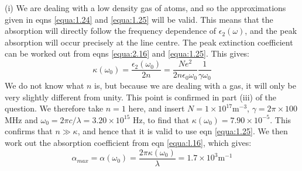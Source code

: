 \documentclass[12pt]{book}
\def\m{\mathrm{m}}
\begin{document}
\begin{Answer}
  (i) We are dealing with a low density gas of atoms, and so the approximations given in eqns \ref{equa:1.24} and \ref{equa:1.25} will be valid. This means that the absorption will directly follow the frequency dependence of $\epsilon_2(\omega)$, and the peak absorption will occur precisely at the line centre. The peak extinction coefficient can be worked out from eqns \ref{equa:2.16} and \ref{equa:1.25}. This gives:
  \begin{equation*}
    \kappa(\omega_0)=\frac{\epsilon_2(\omega_0)}{2n}=\frac{Ne^2}{2n\epsilon_0\omega_0}\frac{1}{\gamma\omega_0}
  \end{equation*}
  We do not know what $n$ is, but because we are dealing with a gas, it will only be very slightly different from unity. This point is confirmed in part (iii) of the question. We therefore take $n=1$ here, and insert $N=1\times10^{17}\m^{-3}$, $\gamma=2\pi\times100$ MHz and $\omega_0=2\pi c/\lambda=3.20\times10^{15}$ Hz, to find that $\kappa(\omega_0)= 7.90\times10^{-5}$. This confirms that $n\gg\kappa$, and hence that it is valid to use eqn \ref{equa:1.25}. We then work out the absorption coefficient from eqn \ref{equa:l.16}, which gives:
  \begin{equation*}
    \alpha_{max}=\alpha(\omega_0)=\frac{2\pi\kappa(\omega_0)}{\lambda}=1.7\times10^3\m^{-1}
  \end{equation*}


\end{Answer}
\end{document}

